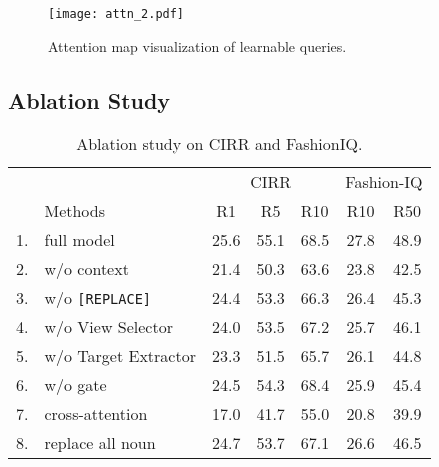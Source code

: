 \documentclass[letterpaper]{article} \usepackage{aaai24}  \usepackage{times}  \usepackage{helvet}  \usepackage{courier}  \usepackage[hyphens]{url}  \usepackage{graphicx} \urlstyle{rm} \def\UrlFont{\rm}  \usepackage{natbib}  \usepackage{caption} \frenchspacing  \setlength{\pdfpagewidth}{8.5in} \setlength{\pdfpageheight}{11in} \usepackage{algorithm}
\begin{document}
\begin{figure}[t]
    \centering
\centering
    \texttt{[image: attn\_2.pdf]}
    \caption{Attention map visualization of learnable queries.}
    \vspace{-10pt}
    \label{fig:attn}
\end{figure}


\subsection{Ablation Study}
\begin{table}[t]
\centering
\scalebox{1.05}
{\scriptsize
\begin{tabular}{llcclcc}
\toprule
\multicolumn{2}{l}{}   & \multicolumn{3}{c}{CIRR}                         & \multicolumn{2}{c}{Fashion-IQ} \\ \cmidrule(lr){3-5}\cmidrule(lr){6-7}
   & Methods           & R1   & R5   & R10                                & R10            & R50           \\ \hline
1. & full model        & 25.6 & 55.1 & \multicolumn{1}{l|}{68.5}          & 27.8           & 48.9          \\
2. & w/o context       & 21.4 & 50.3 & \multicolumn{1}{l|}{63.6}          & 23.8           & 42.5          \\
3. & w/o \texttt{[REPLACE]} & 24.4 & 53.3 & \multicolumn{1}{l|}{66.3}          & 26.4           & 45.3          \\
4. & w/o View Selector             & 24.0 & 53.5 & \multicolumn{1}{l|}{67.2}          & 25.7           & 46.1          \\
5. & w/o Target Extractor       & 23.3 & 51.5 & \multicolumn{1}{c|}{65.7}          & 26.1           & 44.8          \\
6. & w/o gate          & 24.5 & 54.3 & \multicolumn{1}{c|}{68.4}          & 25.9           & 45.4          \\ 
7. &  cross-attention   & 17.0 & 41.7 & \multicolumn{1}{l|}{55.0}          & 20.8           & 39.9          \\
8. & replace all noun  & 24.7 & 53.7 & \multicolumn{1}{l|}{67.1}          & 26.6           & 46.5          \\ \bottomrule
\end{tabular}}
\caption{Ablation study on CIRR and FashionIQ.}
\vspace{-10pt}
\label{tab:ablation}
\end{table}
\end{document}
